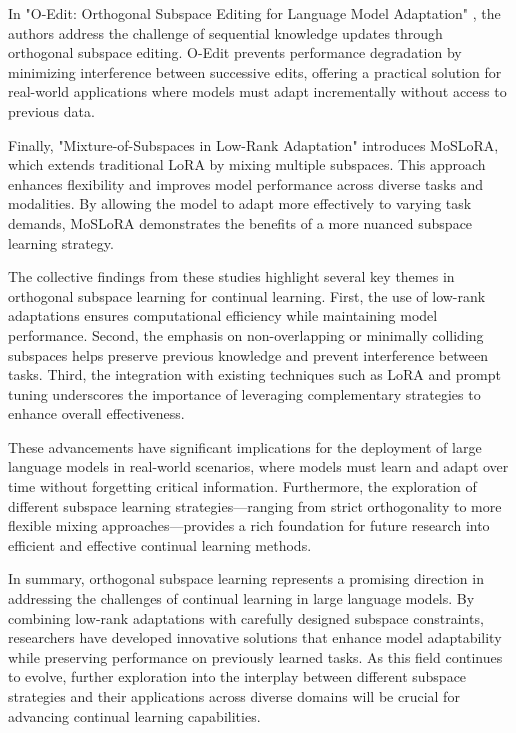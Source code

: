 \documentclass[conference]{IEEEtran}
\begin{document}
In "O-Edit: Orthogonal Subspace Editing for Language Model Adaptation" \cite{bX}, the authors address the challenge of sequential knowledge updates through orthogonal subspace editing. O-Edit prevents performance degradation by minimizing interference between successive edits, offering a practical solution for real-world applications where models must adapt incrementally without access to previous data.

Finally, "Mixture-of-Subspaces in Low-Rank Adaptation" \cite{bX} introduces MoSLoRA, which extends traditional LoRA by mixing multiple subspaces. This approach enhances flexibility and improves model performance across diverse tasks and modalities. By allowing the model to adapt more effectively to varying task demands, MoSLoRA demonstrates the benefits of a more nuanced subspace learning strategy.

The collective findings from these studies highlight several key themes in orthogonal subspace learning for continual learning. First, the use of low-rank adaptations ensures computational efficiency while maintaining model performance. Second, the emphasis on non-overlapping or minimally colliding subspaces helps preserve previous knowledge and prevent interference between tasks. Third, the integration with existing techniques such as LoRA and prompt tuning underscores the importance of leveraging complementary strategies to enhance overall effectiveness.

These advancements have significant implications for the deployment of large language models in real-world scenarios, where models must learn and adapt over time without forgetting critical information. Furthermore, the exploration of different subspace learning strategies—ranging from strict orthogonality to more flexible mixing approaches—provides a rich foundation for future research into efficient and effective continual learning methods.

In summary, orthogonal subspace learning represents a promising direction in addressing the challenges of continual learning in large language models. By combining low-rank adaptations with carefully designed subspace constraints, researchers have developed innovative solutions that enhance model adaptability while preserving performance on previously learned tasks. As this field continues to evolve, further exploration into the interplay between different subspace strategies and their applications across diverse domains will be crucial for advancing continual learning capabilities.
\end{document}
